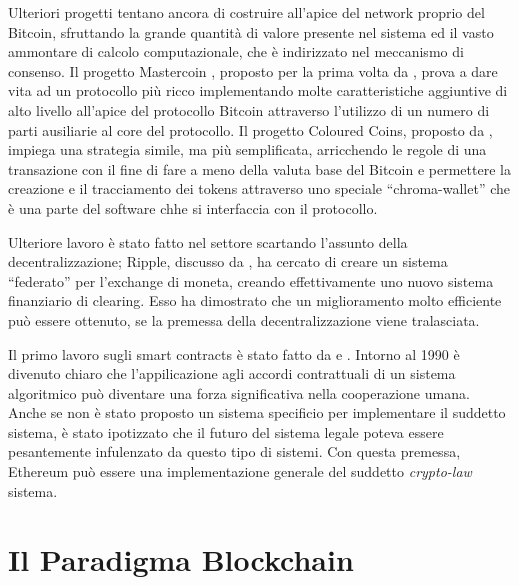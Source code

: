 \documentclass[9pt,oneside]{amsart}
\begin{document}
\begin{multicols}{2}
Ulteriori progetti tentano ancora di costruire all'apice del network proprio del Bitcoin, sfruttando la grande quantità di valore presente nel sistema ed il vasto ammontare di calcolo computazionale, che è indirizzato nel meccanismo di consenso. Il progetto Mastercoin , proposto per la prima volta da \cite{mastercoin2013willett}, prova a dare vita ad un protocollo più ricco implementando molte caratteristiche aggiuntive di alto livello all'apice del protocollo Bitcoin attraverso l'utilizzo di un numero di parti ausiliarie al core del protocollo. Il progetto Coloured Coins, proposto da \cite{colouredcoins2012rosenfeld}, impiega una strategia simile, ma più semplificata, arricchendo le regole di una transazione con il fine di fare a meno della valuta base del Bitcoin e permettere la creazione e il tracciamento dei tokens attraverso uno speciale ``chroma-wallet'' che è una parte del software chhe si interfaccia con il protocollo.

Ulteriore lavoro è stato fatto nel settore scartando l'assunto della decentralizzazione; Ripple, discusso da \cite{boutellier2014pirates}, ha cercato di creare un sistema ``federato'' per l'exchange di moneta, creando effettivamente uno nuovo sistema finanziario di clearing. Esso ha dimostrato che un miglioramento molto efficiente può essere ottenuto, se la premessa della decentralizzazione viene tralasciata.

Il primo lavoro sugli smart contracts è stato fatto da \cite{szabo1997formalizing} e \cite{miller1997future}. Intorno al 1990 è divenuto chiaro che l'appilicazione agli accordi contrattuali di un sistema algoritmico può diventare una forza significativa nella cooperazione umana. Anche se non è stato proposto un sistema specificio per implementare il suddetto sistema, è stato ipotizzato che il futuro del sistema legale poteva essere pesantemente infulenzato da questo tipo di sistemi. Con questa premessa, Ethereum può essere una implementazione generale del suddetto \textit{crypto-law} sistema.


\section{Il Paradigma Blockchain} \label{ch:overview}


\end{multicols}
\end{document}
